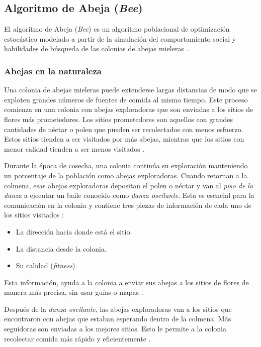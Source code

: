 \subsection{Algoritmo de Abeja (\emph{Bee})} \label{sect:metabee}

    El algoritmo de Abeja (\emph{Bee}) es un algoritmo poblacional de
optimización estocástico mo\-de\-la\-do a partir de la simulación del comportamiento
social y habilidades de búsqueda de las colonias de abejas mieleras \cite{BEE_0}.

\subsubsection{Abejas en la naturaleza}

    Una colonia de abejas mieleras puede extenderse largas distancias
de modo que se exploten grandes números de fuentes de comida al mismo
tiempo. Este proceso comienza en una colonia con abejas exploradoras
que son enviadas a los sitios de flores más prometedores. Los sitios
prometedores son aquellos con grandes cantidades de néctar o polen
que pueden ser recolectados con menos esfuerzo. Estos sitios tienden a ser
visitados por más  abejas, mientras que los sitios con menor calidad tienden
a ser menos visitados \cite{BEE_0}.

    Durante la época de cosecha, una colonia continúa su exploración
manteniendo un porcentaje de la población como abejas exploradoras.
Cuando retornan a la colmena, esas abejas exploradoras depositan el
polen o néctar y van al \emph{piso de la danza} a ejecutar un baile
conocido como \emph{danza oscilante}. Esta es esencial para la comunicación
en la colonia y contiene tres piezas de información
de cada uno de los sitios visitados \cite{BEE_0}: 
\begin{itemize}
    \item La dirección hacia donde está el sitio.
    \item La distancia desde la colonia.
    \item Su calidad (\emph{fitness}).
\end{itemize}
    Esta información, ayuda a la colonia a enviar sus abejas a los sitios de
flores de manera más precisa, sin usar guías o mapas \cite{BEE_0}.

    Después de la \emph{danza oscilante}, las abejas exploradoras van a los
sitios que encontraron con abejas que estaban esperando dentro de la colmena.
Más seguidoras son enviadas a los mejores sitios. Esto le permite a la colonia
recolectar comida más rápido y eficientemente \cite{BEE_0}.

